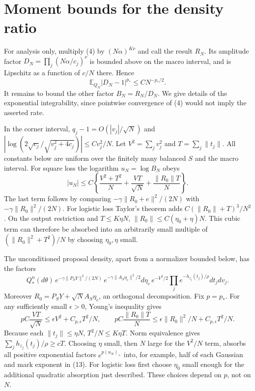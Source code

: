 \documentclass[11pt]{article}
\newcommand{\E}{\mathbb E}\newcommand{\R}{\mathbb R}
\begin{document}
\section{Moment bounds for the density ratio}
For analysis only, multiply (4) by $(N\alpha)^{K\nu}$ and call the
result $R_N$. Its amplitude factor
$D_N=\prod_j(N\alpha/c_j)^\nu$ is bounded above on the macro interval,
and is Lipschitz as a function of $c/N$ there. Hence
\[
                         \E_{Q_N}|D_N-1|^{p_*}\le CN^{-p_*/2}. \tag{11}
\]
It remains to bound the other factor $B_N=R_N/D_N$. We give details
of the exponential integrability, since pointwise convergence of (4)
would not imply the asserted rate.

In the corner interval, $q_j-1=O(|v_j|/\sqrt N)$ and
$|\log(2\sqrt{c_j}/\sqrt{v_j^2+4c_j})|\le Cv_j^2/N$.
Let $V^2=\sum_jv_j^2$ and $T=\sum_j\|t_j\|$. All constants below
are uniform over the finitely many balanced $S$ and the macro interval.
For square loss the logarithm $u_N=\log B_N$ obeys
\[
 |u_N|\le C\left\{\frac{V^2+T^2}{N}
              +\frac{VT}{\sqrt N}+\frac{\|R_0\|T}{N}\right\}. \tag{12}
\]
The last term follows by comparing
$-\gamma\|R_0+e\|^2/(2N)$ with $-\gamma\|R_0\|^2/(2N)$.
For logistic loss Taylor's theorem adds
$C(\|R_0\|+T)^3/N^2$. On the output restriction and $T\le K\eta N$,
$\|R_0\|\le C(\eta_0+\eta)N$. This cubic term can therefore be
absorbed into an arbitrarily small multiple of
$(\|R_0\|^2+T^2)/N$ by choosing $\eta_0,\eta$ small.

The unconditioned proposal density, apart from a normalizer bounded
below, has the factors
\[
 Q_*^n(d\theta)\,
 e^{-\gamma\|P_SY\|^2/(2N)}\,
 e^{-\gamma\|A_S\eta_c\|^2/2}d\eta_c\,
 e^{-V^2/2}\prod_j e^{-h_{z_j}(t_j)/\rho}dt_jdv_j.       \tag{13}
\]
Moreover $R_0=P_SY+\sqrt N A_S\eta_c$, an orthogonal decomposition.
Fix $p=p_*$. For any sufficiently small $\epsilon>0$, Young's inequality
gives
\[
 pC\frac{VT}{\sqrt N}\le\epsilon V^2+C_{p,\epsilon}T^2/N,
 \qquad
 pC\frac{\|R_0\|T}{N}\le\epsilon\|R_0\|^2/N
                                      +C_{p,\epsilon}T^2/N.
\]
Because each $\|t_j\|\le\eta N$, $T^2/N\le K\eta T$.
Norm equivalence gives $\sum_jh_{z_j}(t_j)/\rho\ge cT$.
Choosing $\eta$ small, then $N$ large for the $V^2/N$ term, absorbs
all positive exponential factors $e^{p(u_N)_+}$ into, for example,
half of each Gaussian and mark exponent in (13). For logistic loss
first choose $\eta_0$ small enough for the additional quadratic
absorption just described. These choices depend on $p$, not on $N$.
\end{document}
